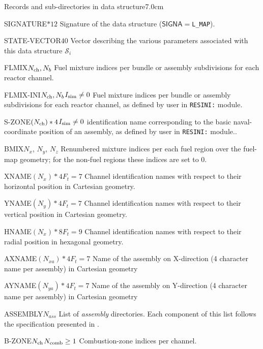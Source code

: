 \begin{DescriptionEnregistrement}{Records and sub-directories
 in  data structure}{7.0cm} \label{tabl:tabfmap}

\CharEnr
 {SIGNATURE}{$*12$}
 {Signature of the  data structure ($\mathsf{SIGNA}=${\tt L\_MAP}).}

\IntEnr
  {STATE-VECTOR}{$40$}
  {Vector describing the various parameters associated with this data structure
  $\mathcal{S}_i$}

\IntEnr
 {FLMIX}{$N_{\rm ch}, N_b$}
 {Fuel mixture indices per bundle or assembly subdivisions for each reactor channel.}

\OptIntEnr
 {FLMIX-INI}{$N_{\rm ch}, N_b$}{$I_{\rm sim}\ne 0$}
 {Fuel mixture indices per bundle or assembly subdivisions for each reactor channel, as defined by user
 in {\tt RESINI:} module.}

\OptCharEnr
 {S-ZONE}{$(N_{\rm ch})*4$}{$I_{\rm sim}\ne 0$}
 {identification name corresponding to the basic naval-coordinate position of an assembly, as defined by user
 in {\tt RESINI:} module..}

\IntEnr
 {BMIX}{$N_x$, $N_y$, $N_z$}
 {Renumbered mixture indices per each fuel region over the fuel-map
  geometry; for the non-fuel regions these indices are set to 0.}

\OptCharEnr
 {XNAME}{$(N_x)*4$}{$F_{t}=7$}
 {Channel identification names with respect to their horizontal position in Cartesian geometry.}

\OptCharEnr
 {YNAME}{$(N_y)*4$}{$F_{t}=7$}
 {Channel identification names with respect to their vertical position in Cartesian geometry.}

\OptCharEnr
 {HNAME}{$(N_x)*8$}{$F_{t}=9$}
 {Channel identification names with respect to their radial position in hexagonal geometry.}

\OptCharEnr
  {AXNAME}{$(N_{xa})*4$}{$F_{t}=7$}
  {Name of the assembly on X-direction (4 character name per assembly) in Cartesian geometry}

\OptCharEnr
  {AYNAME}{$(N_{ya})*4$}{$F_{t}=7$}
  {Name of the assembly on Y-direction (4 character name per assembly) in Cartesian geometry}

\OptDirlEnr
  {ASSEMBLY}{$N_{ass}$}{}
  {List of {\sl assembly} directories. Each component of this list follows the specification
   presented in .}

\OptIntEnr
 {B-ZONE}{$N_{\rm ch}$}{$N_{\rm comb}\geq1$}
 {Combustion-zone indices per channel.}


\end{DescriptionEnregistrement}
